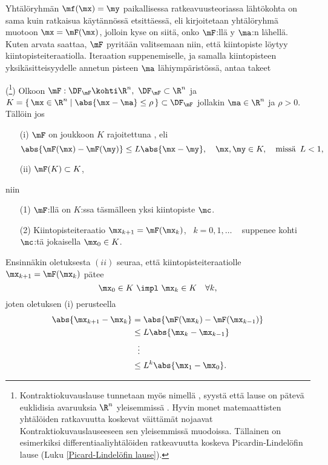 %
Yhtälöryhmän $\mf(\mx)=\my$ paikallisessa ratkeavuusteoriassa lähtökohta on sama kuin
ratkaisua käytännössä etsittäessä, eli kirjoitetaan yhtälöryhmä muotoon $\mx=\mF(\mx)$,
jolloin kyse on siitä, onko $\mF$:llä y
%
 $\ma$:n lähellä. Kuten arvata saattaa, $\mF$ pyritään valitsemaan niin, että
kiintopiste löytyy kiintopisteiteraatiolla. Iteraation suppenemiselle, ja samalla kiintopisteen
yksikäsitteisyydelle annetun pisteen $\ma$ lähiympäristössä, antaa takeet
\begin{*Lause} \label{kontraktiokuvauslause} 
(\footnote[2]{Kontraktiokuvauslause tunnetaan myös nimellä 
, syystä että lause on pätevä euklidisia avaruuksia $\R^n$ 
yleisemmissä . Hyvin monet matemaattisten yhtälöiden ratkavuutta 
koskevat väittämät nojaavat Kontraktiokuvauslauseeseen sen yleisemmissä muodoissa. Tällainen
on esimerkiksi differentiaaliyhtälöiden ratkeavuutta koskeva Picardin-Lindelöfin lause
(Luku \ref{Picard-Lindelöfin lause}). })
Olkoon $\mF:\DF_\mF\kohti\R^n,\ \DF_\mF\subset\R^n$ ja 
$K=\{\,\mx\in\R^n \mid \abs{\mx-\ma} \le \rho\,\}\subset\DF_\mF$ jollakin $\ma\in\R^n$ ja 
$\rho>0$. Tällöin jos %
\begin{itemize}
\item[(i)] $\mF$ on joukkoon $K$ rajoitettuna , eli
\[
\abs{\mF(\mx)-\mF(\my)} \le L\abs{\mx-\my}, \quad \mx,\my\in K,\quad \text{missä}\,\ L<1,
\]
\item[(ii)] $\mF(K)\subset K$,
\end{itemize}
niin
\begin{itemize}
\item[(1)] $\mF$:llä on $K$:ssa täsmälleen yksi kiintopiste $\mc$.
\item[(2)] Kiintopisteiteraatio $\mx_{k+1}=\mF(\mx_k)$, \ $k=0,1,\ldots$ \ 
           suppenee kohti $\mc$:tä jokaisella $\mx_0\in K$. \newline
\end{itemize}
\end{*Lause}
\tod Ensinnäkin oletuksesta $(ii)$ seuraa, että kiintopisteiteraatiolle $\mx_{k+1}=\mF(\mx_k)$
pätee
\[
\mx_0\in K \ \impl \ \mx_k\in K \quad \forall k,
\]
joten oletuksen (i) perusteella
\begin{align*}
\abs{\mx_{k+1}-\mx_k} &= \abs{\mF(\mx_k)-\mF(\mx_{k-1})} \\
&\le L\abs{\mx_k-\mx_{k-1}} \\
& \ \ \vdots \\
&\leq L^k \abs{\mx_1-\mx_0}.
\end{align*}
